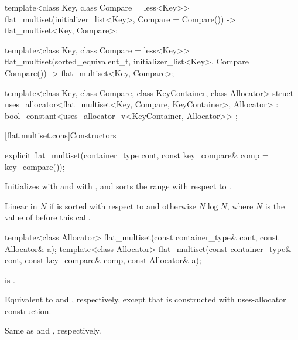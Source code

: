 \begin{codeblock}
{  template<class Key, class Compare = less<Key>>
    flat_multiset(initializer_list<Key>, Compare = Compare())
      -> flat_multiset<Key, Compare>;

  template<class Key, class Compare = less<Key>>
  flat_multiset(sorted_equivalent_t, initializer_list<Key>, Compare = Compare())
      -> flat_multiset<Key, Compare>;

  template<class Key, class Compare, class KeyContainer, class Allocator>
    struct uses_allocator<flat_multiset<Key, Compare, KeyContainer>, Allocator>
      : bool_constant<uses_allocator_v<KeyContainer, Allocator>> { };
}
\end{codeblock}

[flat.multiset.cons]{Constructors}

%
\begin{itemdecl}
explicit flat_multiset(container_type cont, const key_compare& comp = key_compare());
\end{itemdecl}

\begin{itemdescr}
\pnum
\effects
Initializes  with  and
 with , and
sorts the range  with respect to .

\pnum
\complexity
Linear in $N$ if  is sorted with respect to  and
otherwise $N \log N$, where $N$ is the value of  before this call.
\end{itemdescr}

%
\begin{itemdecl}
template<class Allocator>
  flat_multiset(const container_type& cont, const Allocator& a);
template<class Allocator>
  flat_multiset(const container_type& cont, const key_compare& comp, const Allocator& a);
\end{itemdecl}

\begin{itemdescr}
\pnum
\constraints
{} is .

\pnum
\effects
Equivalent to  and
, respectively,
except that  is constructed with
uses-allocator construction.

\pnum
\complexity
Same as  and
, respectively.
\end{itemdescr}


